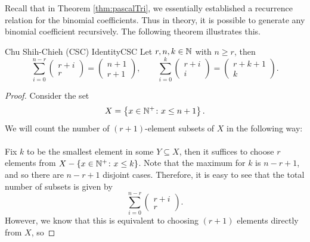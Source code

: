 \documentclass[math]{amznotes}
\theoremstyle{remark}
\newcommand{\0}{\mathbf{0}}
\newcommand{\1}{\mathbf{1}}
\begin{document}
Recall that in Theorem \ref{thm:pascalTri}, we essentially established a recurrence relation for the binomial coefficients. Thus in theory, it is possible to generate any binomial coefficient recursively. The following theorem illustrates this.
\begin{thmbox}{Chu Shih-Chieh (CSC) Identity}{CSC}
    Let $r, n, k \in \mathbb{N}$ with $n \geq r$, then
    \begin{equation*}
        \sum_{i = 0}^{n - r}\begin{pmatrix}
            r + i \\
            r
        \end{pmatrix} = \begin{pmatrix}
            n + 1 \\
            r + 1
        \end{pmatrix}, \qquad \sum_{i = 0}^{k}\begin{pmatrix}
            r + i \\
            i
        \end{pmatrix} = \begin{pmatrix}
            r + k + 1 \\
            k
        \end{pmatrix}.
    \end{equation*}
    \tcblower
    \begin{proof}
        Consider the set
        \begin{displaymath}
            X = \left\{x \in \mathbb{N}^+ \colon x \leq n + 1\right\}.
        \end{displaymath}
        We will count the number of $(r + 1)$-element subsets of $X$ in the following way:
        \\\\
        Fix $k$ to be the smallest element in some $Y \subseteq X$, then it suffices to choose $r$ elements from $X - \left\{x \in \mathbb{N}^+ \colon x \leq k\right\}$. Note that the maximum for $k$ is $n - r + 1$, and so there are $n - r + 1$ disjoint cases. Therefore, it is easy to see that the total number of subsets is given by
        \begin{displaymath}
            \sum_{i = 0}^{n - r}\begin{pmatrix}
                r + i \\
                r
            \end{pmatrix}.
        \end{displaymath}
        However, we know that this is equivalent to choosing $(r + 1)$ elements directly from $X$, so

\end{proof}
\end{thmbox}
\end{document}
